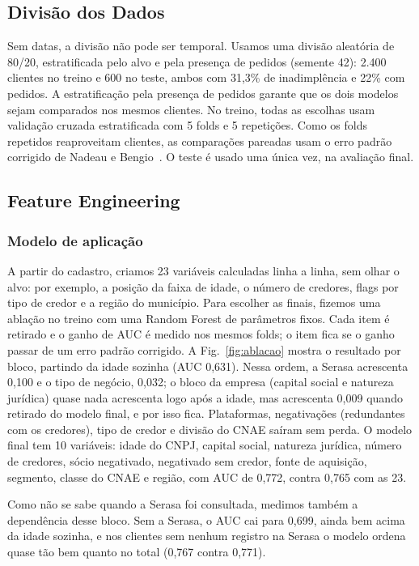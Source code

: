 \documentclass[conference]{IEEEtran}
\begin{document}
\subsection{Divisão dos Dados}
Sem datas, a divisão não pode ser temporal. Usamos uma divisão aleatória de 80/20, estratificada pelo alvo e pela presença de pedidos (semente 42): 2.400 clientes no treino e 600 no teste, ambos com 31,3\% de inadimplência e 22\% com pedidos. A estratificação pela presença de pedidos garante que os dois modelos sejam comparados nos mesmos clientes. No treino, todas as escolhas usam validação cruzada estratificada com 5 folds e 5 repetições. Como os folds repetidos reaproveitam clientes, as comparações pareadas usam o erro padrão corrigido de Nadeau e Bengio~\cite{nadeau2003}. O teste é usado uma única vez, na avaliação final.

\subsection{Feature Engineering}

\subsubsection{Modelo de aplicação}
A partir do cadastro, criamos 23 variáveis calculadas linha a linha, sem olhar o alvo: por exemplo, a posição da faixa de idade, o número de credores, flags por tipo de credor e a região do município. Para escolher as finais, fizemos uma ablação no treino com uma Random Forest de parâmetros fixos. Cada item é retirado e o ganho de AUC é medido nos mesmos folds; o item fica se o ganho passar de um erro padrão corrigido. A Fig.~\ref{fig:ablacao} mostra o resultado por bloco, partindo da idade sozinha (AUC 0,631). Nessa ordem, a Serasa acrescenta 0,100 e o tipo de negócio, 0,032; o bloco da empresa (capital social e natureza jurídica) quase nada acrescenta logo após a idade, mas acrescenta 0,009 quando retirado do modelo final, e por isso fica. Plataformas, negativações (redundantes com os credores), tipo de credor e divisão do CNAE saíram sem perda. O modelo final tem 10 variáveis: idade do CNPJ, capital social, natureza jurídica, número de credores, sócio negativado, negativado sem credor, fonte de aquisição, segmento, classe do CNAE e região, com AUC de 0,772, contra 0,765 com as 23.

Como não se sabe quando a Serasa foi consultada, medimos também a dependência desse bloco. Sem a Serasa, o AUC cai para 0,699, ainda bem acima da idade sozinha, e nos clientes sem nenhum registro na Serasa o modelo ordena quase tão bem quanto no total (0,767 contra 0,771).
\end{document}
